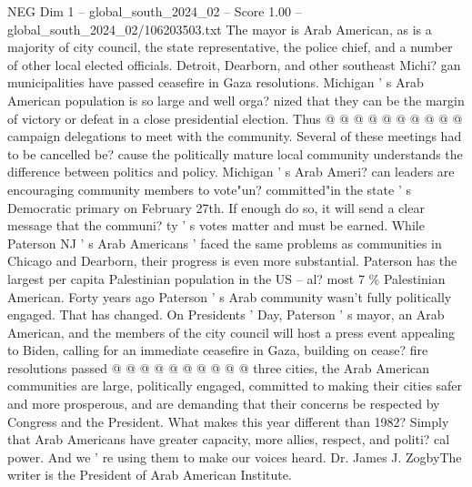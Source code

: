 \begin{textsample}{NEG Dim 1 – global\_south\_2024\_02 – Score 1.00 – global\_south\_2024\_02/106203503.txt}
The mayor is Arab American, as is a majority of city council, the state representative, the police chief, and a number of other local elected officials.
Detroit, Dearborn, and other southeast Michi? gan municipalities have passed ceasefire in Gaza resolutions.
Michigan ' s Arab American population is so large and well orga? nized that they can be the margin of victory or defeat in a close presidential election.
Thus @ @ @ @ @ @ @ @ @ @ campaign delegations to meet with the community.
Several of these meetings had to be cancelled be? cause the politically mature local community understands the difference between politics and policy.
Michigan ' s Arab Ameri? can leaders are encouraging community members to vote"un? committed"in the state ' s Democratic primary on February 27th.
If enough do so, it will send a clear message that the communi? ty ' s votes matter and must be earned.
While Paterson NJ ' s Arab Americans ' faced the same problems as communities in Chicago and Dearborn, their progress is even more substantial.
Paterson has the largest per capita Palestinian population in the US -- al? most 7 \% Palestinian American.
Forty years ago Paterson ' s Arab community wasn't fully politically engaged.
That has changed.
On Presidents ' Day, Paterson ' s mayor, an Arab American, and the members of the city council will host a press event appealing to Biden, calling for an immediate ceasefire in Gaza, building on cease? fire resolutions passed @ @ @ @ @ @ @ @ @ @ three cities, the Arab American communities are large, politically engaged, committed to making their cities safer and more prosperous, and are demanding that their concerns be respected by Congress and the President.
What makes this year different than 1982?
Simply that Arab Americans have greater capacity, more allies, respect, and politi? cal power.
And we ' re using them to make our voices heard.
Dr.
James J.
ZogbyThe writer is the President of Arab American Institute.

\end{textsample}
